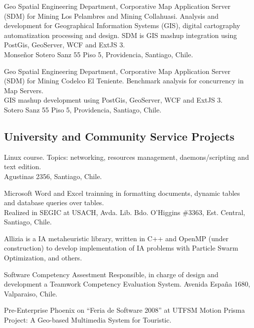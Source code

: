 \documentclass[11pt,letterpaper,roman]{moderncv}
\begin{document}
	 {\sd} {\ikom} {\stgo} {} 
	{Geo Spatial Engineering Department, Corporative Map Application Server (SDM) for
	Mining Los Pelambres and Mining Collahuasi.  Analysis and development for
	Geographical Information Systems (GIS), digital cartography automatization
	processing and design. 
	SDM is GIS mashup integration using PostGis, GeoServer, WCF and ExtJS 3. \\
	Monse\~nor Sotero Sanz 55 Piso 5, Providencia, Santiago, Chile.}

	 {\intership} {\ikom} {\stgo} {}
	{Geo Spatial Engineering Department, Corporative Map Application Server
	(SDM) for  Mining Codelco El Teniente.  Benchmark analysis for concurrency in
	Map Servers. \\
	GIS mashup development using PostGis, GeoServer, WCF and ExtJS 3. \\ Sotero Sanz
	55 Piso 5, Providencia, Santiago, Chile.}

\subsection{University and Community Service Projects}

	 {\tchr} {\ipgamma} {\stgo} {}
	{\sence Linux course. Topics: networking, resources management,
daemons/scripting and text edition.\\ Agustinas 2356, Santiago, Chile.}

	 {\tchr} {\otecnewline} {\stgo} {}
	{\sence Microsoft Word and Excel trainning in formatting documents,
dynamic tables and database queries over tables. \\
	Realized in SEGIC at USACH, Avda. Lib. Bdo. O'Higgins \#3363, Est.
    	Central, Santiago, Chile.}

	
	{Allizia is a IA metaheuristic library, written in C++ and OpenMP (under
	construction) to develop implementation of IA problems with Particle Swarm Optimization, and others.}

	 { } {} {}
	{Software Competency Assestment Responsible, in charge of design
	and development a Teamwork Competency Evaluation System. Avenida Espa\~na 1680,
	Valparaiso, Chile.}

	 {\sd} { } {} {}
	{Pre-Enterprise Phoenix on ``Feria de Software 2008'' at \textsc{UTFSM}
	Motion Prisma Project: A Geo-based Multimedia System for Touristic.}
\end{document}
